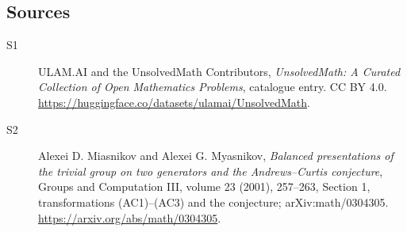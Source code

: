 \documentclass[11pt]{article}
\begin{document}
\subsection{Sources}
\begin{description}
\item[\hypertarget{source:statement:1}{S1}] ULAM.AI and the UnsolvedMath Contributors, \emph{UnsolvedMath: A Curated Collection of Open Mathematics Problems}, catalogue entry. CC BY 4.0. \url{https://huggingface.co/datasets/ulamai/UnsolvedMath}.
\item[\hypertarget{source:statement:2}{S2}] Alexei D. Miasnikov and Alexei G. Myasnikov, \emph{Balanced presentations of the trivial group on two generators and the Andrews--Curtis conjecture}, Groups and Computation III, volume 23 (2001), 257--263, Section 1, transformations (AC1)--(AC3) and the conjecture; arXiv:math/0304305. \url{https://arxiv.org/abs/math/0304305}.
\end{description}
\label{end:statement}
\end{document}
